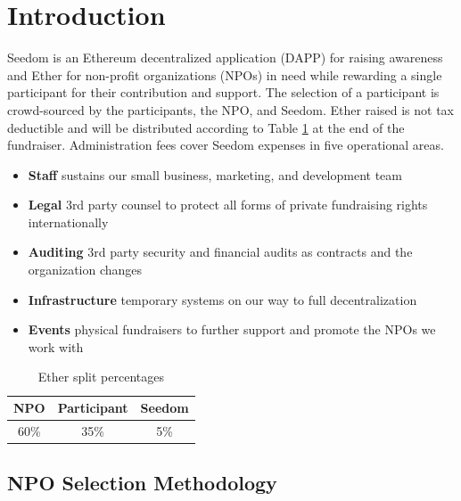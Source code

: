 \documentclass[11pt]{article}
\begin{document}
\tableofcontents
\pagebreak

\section{Introduction}

Seedom is an Ethereum decentralized application (DAPP) for raising awareness and Ether for non-profit organizations (NPOs) in need while rewarding a single participant for their contribution and support. The selection of a participant is crowd-sourced by the participants, the NPO, and Seedom. Ether raised is not tax deductible and will be distributed according to Table \ref{tab:etherSplitPercentages} at the end of the fundraiser. Administration fees cover Seedom expenses in five operational areas.

\begin{itemize}
\item{\textbf{Staff} sustains our small business, marketing, and development team}
\item{\textbf{Legal} 3rd party counsel to protect all forms of private fundraising rights internationally}
\item{\textbf{Auditing} 3rd party security and financial audits as contracts and the organization changes}
\item{\textbf{Infrastructure} temporary systems on our way to full decentralization}
\item{\textbf{Events} physical fundraisers to further support and promote the NPOs we work with}
\end{itemize}

\begin{table}[H]
\begin{center}
\begin{tabular}{| c | c | c |}
\hline
\textbf{NPO} & \textbf{Participant} & \textbf{Seedom} \\ \hline
60\% & 35\%  & 5\% \\ \hline
\end{tabular}
\caption{Ether split percentages}
\label{tab:etherSplitPercentages}
\end{center}
\end{table}

\subsection{NPO Selection Methodology}
\end{document}
